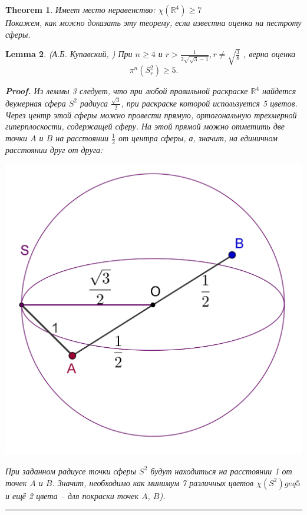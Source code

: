 \documentclass{report}%
\newtheorem{theorem}{Theorem}
\newtheorem{lemma}[theorem]{Lemma}
\newenvironment{proof}[1][Proof]{\textbf{#1.} }{\ \rule{0.5em}{0.5em}}
\begin{document}
\begin{theorem}
		Имеет место неравенство: $\chi(\mathbb{R}^4) \geq 7$ \\
		Покажем, как можно доказать эту теорему, если известна оценка на пестроту сферы.
\end{theorem}

\begin{lemma} (А.Б. Купавский, \cite{Kupavsky2011})
		При $n \geq 4$ и $r > \frac{1}{2\sqrt{\sqrt{3}-1}}, r \ne \sqrt{\frac{3}{8}}$ , верна оценка
		\begin{equation}
				\pi^n(S_r^2) \geq 5.
		\end{equation}
		
		\begin{proof}
				Из леммы 3 следует, что при любой правильной раскраске $\mathbb{R}^4$
				найдется двумерная сфера $S^2$ радиуса $\frac{\sqrt{3}}{2}$, при раскраске которой используется 5 цветов.
				Через центр этой сферы можно провести прямую, ортогональную трехмерной гиперплоскости, содержащей сферу.
				На этой прямой можно отметить две точки $A$ и $B$ на расстоянии $\frac{1}{2}$ от центра сферы, а,
				значит, на единичном расстоянии друг от друга: \\
				\begin{center}
						\includegraphics[scale = 0.25]{R4}
				\end{center}
				
				При заданном радиусе точки сферы $S^2$ будут находиться на расстоянии 1 от точек $A$ и $B$.
				Значит, необходимо как минимум 7 различных цветов $\chi(S^2) geq 5$ и ещё 2 цвета – для покраски точек $A$, $B$). 
		\end{proof}
\end{lemma}
\end{document}
